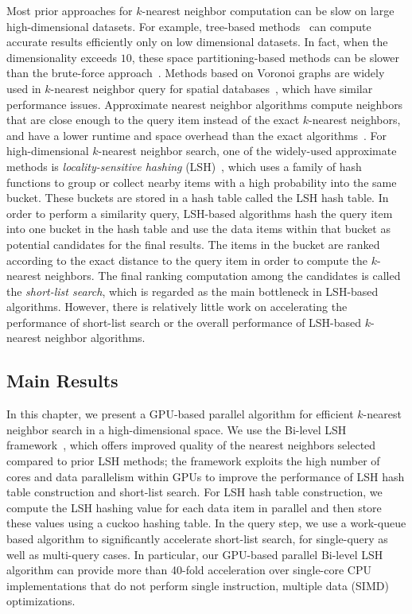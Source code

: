 Most prior approaches for $k$-nearest neighbor computation can be slow on large high-dimensional datasets. For example, tree-based methods~\cite{Samet:2005:FMM} can compute accurate results efficiently only on low dimensional datasets. In fact, when the dimensionality exceeds $10$, these space partitioning-based methods can be slower than the brute-force approach~\cite{Weber:1998:QAP}. Methods based on Voronoi graphs are widely used in $k$-nearest neighbor query for spatial databases~\cite{Kolahdouzan:2004,Hu:2010:VSQ}, which have similar performance issues. Approximate nearest neighbor algorithms compute neighbors that are close enough to the query item instead of the exact $k$-nearest neighbors, and have a lower runtime and space overhead than the exact algorithms~\cite{Kleinberg:1997}. For high-dimensional $k$-nearest neighbor search, one of the widely-used approximate methods is \emph{locality-sensitive hashing} (LSH)~\cite{Datar:2004:LHS}, which uses a family of hash functions to group or collect nearby items with a high probability into the same bucket. These buckets are stored in a hash table called the LSH hash table. In order to perform a similarity query, LSH-based algorithms hash the query item into one bucket in the hash table and use the data items within that bucket as potential candidates for the final results. The items in the bucket are ranked according to the exact distance to the query item in order to compute the $k$-nearest neighbors.
The final ranking computation among the candidates is called the \emph{short-list search}, which is regarded as the main bottleneck in LSH-based algorithms. However, there is relatively little work on accelerating the performance of short-list search or the overall performance of LSH-based $k$-nearest neighbor algorithms.

\subsection{Main Results}
In this chapter, we present a GPU-based parallel algorithm for efficient $k$-nearest neighbor search in a high-dimensional space. We use the Bi-level LSH framework~\cite{BilevelLSH2011}, which offers improved quality of the nearest neighbors selected compared to prior LSH methods; the framework exploits the high number of cores and data parallelism within GPUs to improve the performance of LSH hash table construction and short-list search. For LSH hash table construction, we compute the LSH hashing value for each data item in parallel and then store these values using a cuckoo hashing table. In the query step, we use a work-queue based algorithm to significantly accelerate short-list search, for single-query as well as multi-query cases. In particular, our GPU-based parallel Bi-level LSH algorithm can provide more than 40-fold acceleration over single-core CPU implementations that do not perform single instruction, multiple data (SIMD) optimizations.

